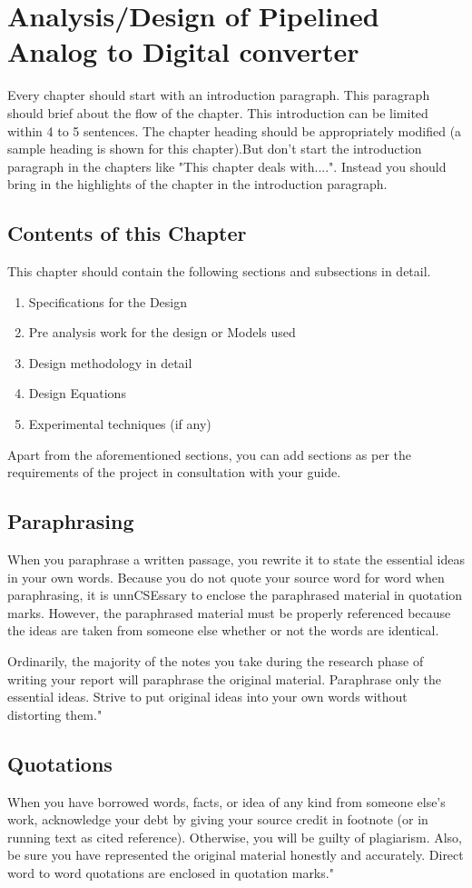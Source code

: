 \chapter{Analysis/Design of Pipelined Analog to Digital converter}

Every chapter should start with an introduction paragraph. This paragraph should brief about the flow of the chapter. This introduction can be limited within 4 to 5 sentences. The chapter heading should be appropriately modified (a sample heading is shown for this chapter).But don't start the introduction paragraph in the chapters like "This chapter deals with....". Instead you should bring in the highlights of the chapter in the introduction paragraph. 
\section{Contents of this Chapter}
This chapter should contain the following sections and subsections in detail.
\begin{enumerate}
\item Specifications for the Design
\item Pre analysis work for the design or Models used
\item Design methodology in detail
\item Design Equations
\item Experimental techniques (if any)
\end{enumerate}
Apart from the aforementioned sections, you can add sections as per the requirements of the project in consultation with your guide.

\section{Paraphrasing}
When you paraphrase a written passage, you rewrite it to state the essential ideas in your own words. Because you do not quote your source word for word when paraphrasing, it is unnCSEssary to enclose the paraphrased material in quotation marks. However, the paraphrased material must be properly referenced because the ideas are taken from someone else whether or not the words are identical. 

Ordinarily, the majority of the notes you take during the research phase of writing your report will paraphrase the original material. Paraphrase only the essential ideas. Strive to put original ideas into your own words without distorting them."

\section{Quotations}
When you have borrowed words, facts, or idea of any kind from someone else's work, acknowledge your debt by giving your source credit in footnote (or in running text as cited reference). Otherwise, you will be guilty of plagiarism. Also, be sure you have represented the original material honestly and accurately. Direct word to word quotations are enclosed in quotation marks."

